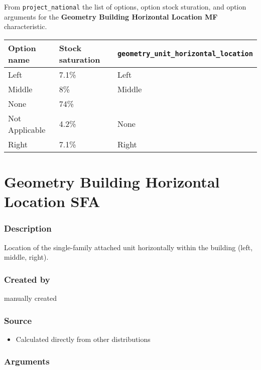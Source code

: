 From \texttt{project\_national} the list of options, option stock
sturation, and option arguments for the \textbf{Geometry Building
Horizontal Location MF} characteristic.

\begin{longtable}[]{@{}lll@{}}
\toprule\noalign{}
Option name & Stock saturation &
\texttt{geometry\_unit\_horizontal\_location} \\
\midrule\noalign{}
\endhead
\bottomrule\noalign{}
\endlastfoot
Left & 7.1\% & Left \\
Middle & 8\% & Middle \\
None & 74\% & \\
Not Applicable & 4.2\% & None \\
Right & 7.1\% & Right \\
\end{longtable}

\section{Geometry Building Horizontal Location
SFA}\label{geometry_building_horizontal_location_sfa}

\subsubsection{Description}\label{description-45}

Location of the single-family attached unit horizontally within the
building (left, middle, right).

\subsubsection{Created by}\label{created-by-45}

manually created

\subsubsection{Source}\label{source-44}

\begin{itemize}
 
\item
  Calculated directly from other distributions
\end{itemize}

\subsubsection{Arguments}\label{arguments-29}

